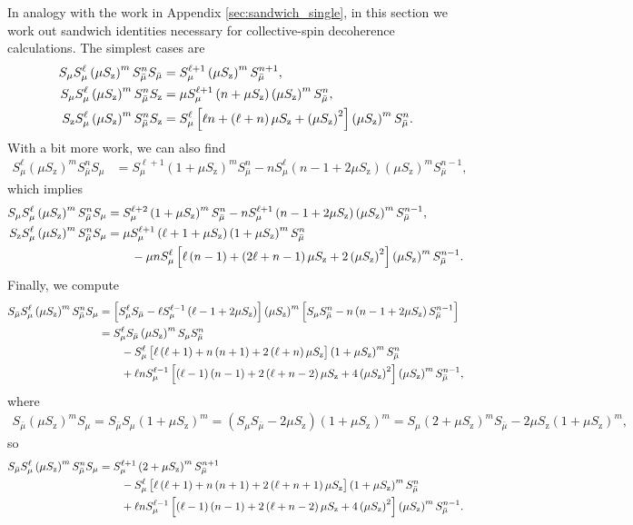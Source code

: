 \documentclass[aps,pra,twocolumn,longbibliography]{revtex4-2}
\newcommand{\p}[1]{\left( #1 \right)} %
\renewcommand{\sp}[1]{\left[ #1 \right]} %
\newcommand{\z}{\text{z}}
\newcommand{\bmu}{{\bar\mu}}
\newcommand{\1}{\mathds{1}}
\begin{document}
In analogy with the work in Appendix \ref{sec:sandwich_single}, in
this section we work out sandwich identities necessary for
collective-spin decoherence calculations.  The simplest cases are
\begin{align}
  S_\mu S_\mu^\ell \p{\mu S_\z}^m S_\bmu^n S_\bmu
  &= S_\mu^{\ell+1} \p{\mu S_\z}^m S_\bmu^{n+1},
  \allowdisplaybreaks \\
  S_\mu S_\mu^\ell \p{\mu S_\z}^m S_\bmu^n S_\z
  &= \mu S_\mu^{\ell+1} \p{n+\mu S_\z} \p{\mu S_\z}^m S_\bmu^n,
  \allowdisplaybreaks \\
  S_\z S_\mu^\ell \p{\mu S_\z}^m S_\bmu^n S_\z
  &= S_\mu^\ell \sp{\ell n + \p{\ell+n} \mu S_\z + \p{\mu S_\z}^2}
  \p{\mu S_\z}^m S_\bmu^n.
\end{align}
With a bit more work, we can also find
\begin{align}
  S_\mu^\ell \p{\mu S_\z}^m S_\bmu^n S_\mu
  &= S_\mu^{\ell+1} \p{1+\mu S_\z}^m S_\bmu^n
  - n S_\mu^\ell \p{n-1+2\mu S_\z} \p{\mu S_\z}^m S_\bmu^{n-1},
\end{align}
which implies
\begin{align}
  S_\mu S_\mu^\ell \p{\mu S_\z}^m S_\bmu^n S_\mu
  &= S_\mu^{\ell+2} \p{1+\mu S_\z}^m S_\bmu^n
  - n S_\mu^{\ell+1} \p{n-1+2\mu S_\z} \p{\mu S_\z}^m S_\bmu^{n-1},
  \allowdisplaybreaks \\
  S_\z S_\mu^\ell \p{\mu S_\z}^m S_\bmu^n S_\mu
  &= \mu S_\mu^{\ell+1} \p{\ell+1+\mu S_\z} \p{1+\mu S_\z}^m S_\bmu^n
  \notag \\
  &\qquad - \mu n S_\mu^\ell
  \sp{\ell\p{n-1} + \p{2\ell+n-1}\mu S_\z + 2\p{\mu S_\z}^2}
  \p{\mu S_\z}^m S_\bmu^{n-1}.
\end{align}
Finally, we compute
\begin{align}
  S_\bmu S_\mu^\ell \p{\mu S_\z}^m S_\bmu^n S_\mu
  &= \sp{S_\mu^\ell S_\bmu - \ell S_\mu^{\ell-1} \p{\ell-1+2\mu S_\z}}
  \p{\mu S_\z}^m
  \sp{S_\mu S_\bmu^n - n \p{n-1+2\mu S_\z} S_\bmu^{n-1}} \notag \\
  &= S_\mu^\ell S_\bmu \p{\mu S_\z}^m S_\mu S_\bmu^n \notag \\
  &\qquad - S_\mu^\ell
  \sp{\ell\p{\ell+1} + n\p{n+1}+2\p{\ell+n}\mu S_\z}
  \p{1+\mu S_\z}^m S_\bmu^n \notag \\
  &\qquad + \ell n S_\mu^{\ell-1}
  \sp{\p{\ell-1}\p{n-1}+2\p{\ell+n-2}\mu S_\z + 4\p{\mu S_\z}^2}
  \p{\mu S_\z}^m S_\bmu^{n-1},
\end{align}
where
\begin{align}
  S_\bmu \p{\mu S_\z}^m S_\mu
  = S_\bmu S_\mu \p{1+\mu S_\z}^m
  = \p{S_\mu S_\bmu - 2\mu S_\z} \p{1+\mu S_\z}^m
  = S_\mu \p{2+\mu S_\z}^m S_\bmu - 2\mu S_\z \p{1+\mu S_\z}^m,
\end{align}
so
\begin{align}
  S_\bmu S_\mu^\ell \p{\mu S_\z}^m S_\bmu^n S_\mu
  &= S_\mu^{\ell+1} \p{2+\mu S_\z}^m S_\bmu^{n+1} \notag \\
  &\qquad - S_\mu^\ell
  \sp{\ell\p{\ell+1} + n\p{n+1}+2\p{\ell+n+1}\mu S_\z}
  \p{1+\mu S_\z}^m S_\bmu^n \notag \\
  &\qquad + \ell n S_\mu^{\ell-1}
  \sp{\p{\ell-1}\p{n-1}+2\p{\ell+n-2}\mu S_\z + 4\p{\mu S_\z}^2}
  \p{\mu S_\z}^m S_\bmu^{n-1}.
\end{align}
\end{document}
